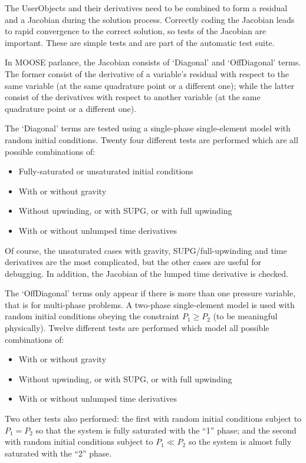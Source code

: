 \documentclass[]{scrreprt}
\begin{document}
The UserObjects and their derivatives need to be combined to form a
residual and a Jacobian during the solution process.  Correctly coding
the Jacobian leads to rapid convergence to the correct solution, so
tests of the Jacobian are important.  These are simple tests and are
part of the automatic test suite.

In MOOSE parlance, the Jacobian consists of `Diagonal' and
`OffDiagonal' terms.  The former consist of the derivative of a
variable's residual with respect to the same variable (at the same
quadrature point or a different one); while the latter
consist of the derivatives with respect to another variable (at the
same quadrature point or a different one).

The `Diagonal' terms are tested using a single-phase single-element
model with random initial conditions.  Twenty four different tests are
performed which are all possible combinations of:
\begin{itemize}
\item Fully-saturated or unsaturated initial conditions
\item With or without gravity
\item Without upwinding, or with SUPG, or with full upwinding
\item With or without unlumped time derivatives
\end{itemize}
Of course, the unsaturated cases with gravity, SUPG/full-upwinding and time
derivatives are the most complicated, but the other cases are useful
for debugging.  In addition, the Jacobian of the lumped time derivative is checked.

The `OffDiagonal' terms only appear if there is more than one pressure
variable, that is for multi-phase problems.  A two-phase
single-element model is used with random initial conditions
obeying the constraint $P_{1}\geq P_{2}$ (to be meaningful physically).  Twelve
different tests are performed which model all possible combinations
of:
\begin{itemize}
\item With or without gravity
\item Without upwinding, or with SUPG, or with full upwinding
\item With or without unlumped time derivatives
\end{itemize}
Two other tests also performed: the first with random initial
conditions subject to $P_{1}=P_{2}$ so that the system is fully
saturated with the ``1'' phase; and the second with random initial
conditions subject to $P_{1}\ll P_{2}$ so the system is almost fully
saturated with the ``2'' phase.
\end{document}
